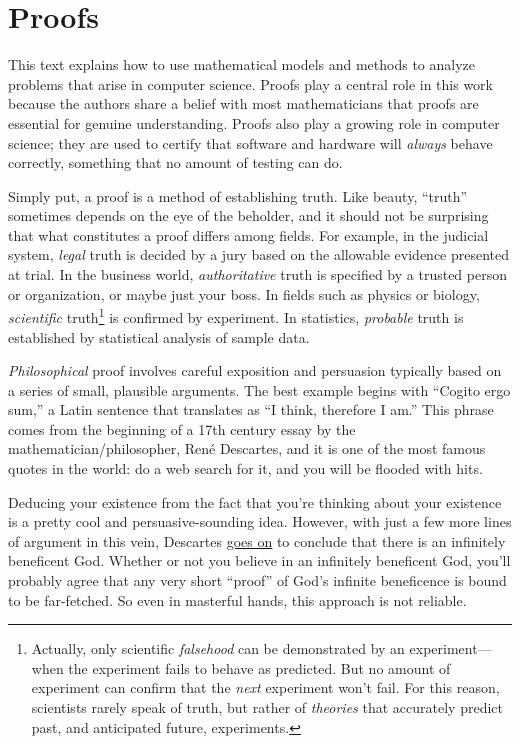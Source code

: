 \part{Proofs}
\label{part:proofs}


\partintro
{}

This text explains how to use mathematical models and methods to analyze
problems that arise in computer science.  Proofs play a central role in
this work because the authors share a belief with most mathematicians that
proofs are essential for genuine understanding.  Proofs also play a
growing role in computer science; they are used to certify that software
and hardware will \emph{always} behave correctly, something that no amount
of testing can do.

Simply put, a proof is a method of establishing truth.  Like beauty,
``truth'' sometimes depends on the eye of the beholder, and it should
not be surprising that what constitutes a proof differs among fields.
For example, in the judicial system, \emph{legal} truth is decided by
a jury based on the allowable evidence presented at trial.  In the
business world, \emph{authoritative} truth is specified by a trusted
person or organization, or maybe just your boss.  In fields such as
physics or biology, \emph{scientific} truth\footnote{Actually, only
  scientific \emph{falsehood} can be demonstrated by an
  experiment---when the experiment fails to behave as predicted.  But
  no amount of experiment can confirm that the \emph{next} experiment
  won't fail.  For this reason, scientists rarely speak of truth, but
  rather of \emph{theories} that accurately predict past, and
  anticipated future, experiments.} is confirmed by experiment.  In statistics,
\emph{probable} truth is established by statistical analysis of sample
data.

\emph{Philosophical} proof involves careful exposition and persuasion
typically based on a series of small, plausible arguments.  The best
example begins with ``Cogito ergo sum,'' a Latin sentence that
translates as ``I think, therefore I am.''  This phrase comes from the
beginning of a 17th century essay by the mathematician/philosopher,
Ren\'e Descartes, and it is one of the most famous quotes in the
world: do a web search for it, and you will be flooded with
hits.

Deducing your existence from the fact that you're thinking about your
existence is a pretty cool and persuasive-sounding idea.  However,
with just a few more lines of argument in this vein, Descartes
\href{http://www.btinternet.com/~glynhughes/squashed/descartes.htm}{goes
  on} to conclude that there is an infinitely beneficent God.  Whether
or not you believe in an infinitely beneficent God, you'll probably
agree that any very short ``proof'' of God's infinite beneficence is
bound to be far-fetched.  So even in masterful hands, this approach is
not reliable.

